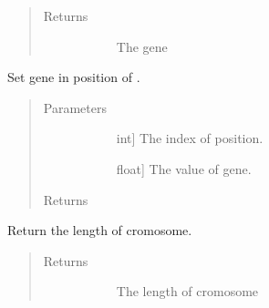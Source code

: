\documentclass[letterpaper,10pt,english]{sphinxmanual}
\begin{document}
\begin{fulllineitems}
\begin{fulllineitems}
\begin{quote}
\begin{description}
\begin{description}
\end{description}

\item[{Returns}] \leavevmode\begin{description}
\item[{}] \leavevmode
The gene

\end{description}

\end{description}\end{quote}

\end{fulllineitems}


\begin{fulllineitems}
\label{\detokenize{pygace:pygace.ga.Cromosome.set_gene}}
Set gene in position of .
\begin{quote}\begin{description}
\item[{Parameters}] \leavevmode\begin{description}
\item[{}] \leavevmode{[}int{]}
The index of position.

\item[{}] \leavevmode{[}float{]}
The value of gene.

\end{description}

\item[{Returns}] \leavevmode\begin{description}
\item[{}] \leavevmode
\end{description}

\end{description}\end{quote}

\end{fulllineitems}


\begin{fulllineitems}
\label{\detokenize{pygace:pygace.ga.Cromosome.size}}
Return the length of cromosome.
\begin{quote}\begin{description}
\item[{Returns}] \leavevmode\begin{description}
\item[{}] \leavevmode
The length of cromosome


\end{description}
\end{description}
\end{quote}
\end{fulllineitems}
\end{fulllineitems}
\end{document}
